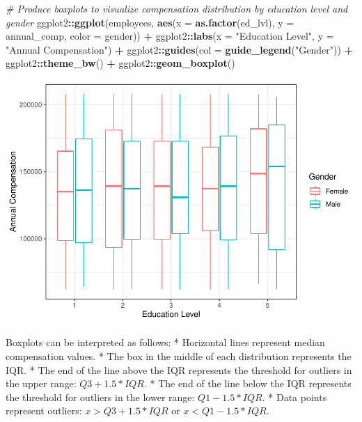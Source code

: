\documentclass[]{book}
\newenvironment{Shaded}{\begin{snugshade}}{\end{snugshade}}
\newcommand{\CommentTok}[1]{\textcolor[rgb]{0.56,0.35,0.01}{\textit{#1}}}
\newcommand{\DataTypeTok}[1]{\textcolor[rgb]{0.13,0.29,0.53}{#1}}
\newcommand{\KeywordTok}[1]{\textcolor[rgb]{0.13,0.29,0.53}{\textbf{#1}}}
\newcommand{\NormalTok}[1]{#1}
\newcommand{\OperatorTok}[1]{\textcolor[rgb]{0.81,0.36,0.00}{\textbf{#1}}}
\newcommand{\StringTok}[1]{\textcolor[rgb]{0.31,0.60,0.02}{#1}}
\begin{document}
\begin{Shaded}
\begin{Highlighting}[]
\CommentTok{# Produce boxplots to visualize compensation distribution by education level and gender}
\NormalTok{ggplot2}\OperatorTok{::}\KeywordTok{ggplot}\NormalTok{(employees, }\KeywordTok{aes}\NormalTok{(}\DataTypeTok{x =} \KeywordTok{as.factor}\NormalTok{(ed_lvl), }\DataTypeTok{y =}\NormalTok{ annual_comp, }\DataTypeTok{color =}\NormalTok{ gender)) }\OperatorTok{+}
\NormalTok{ggplot2}\OperatorTok{::}\KeywordTok{labs}\NormalTok{(}\DataTypeTok{x =} \StringTok{"Education Level"}\NormalTok{, }\DataTypeTok{y =} \StringTok{"Annual Compensation"}\NormalTok{) }\OperatorTok{+}\StringTok{ }
\NormalTok{ggplot2}\OperatorTok{::}\KeywordTok{guides}\NormalTok{(}\DataTypeTok{col =} \KeywordTok{guide_legend}\NormalTok{(}\StringTok{"Gender"}\NormalTok{)) }\OperatorTok{+}
\NormalTok{ggplot2}\OperatorTok{::}\KeywordTok{theme_bw}\NormalTok{() }\OperatorTok{+}
\NormalTok{ggplot2}\OperatorTok{::}\KeywordTok{geom_boxplot}\NormalTok{()}
\end{Highlighting}
\end{Shaded}

\includegraphics{The_People_Analytics_Companion_files/figure-latex/unnamed-chunk-68-1.pdf}

Boxplots can be interpreted as follows:
* Horizontal lines represent median compensation values.
* The box in the middle of each distribution represents the IQR.
* The end of the line above the IQR represents the threshold for outliers in the upper range: \(Q3 + 1.5 * IQR\).
* The end of the line below the IQR represents the threshold for outliers in the lower range: \(Q1 - 1.5 * IQR\).
* Data points represent outliers: \(x > Q3 + 1.5 * IQR\) or \(x < Q1 - 1.5 * IQR\).
\end{document}
